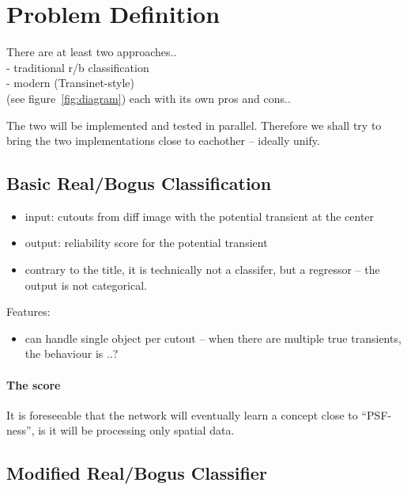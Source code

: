 \section{Problem Definition}

There are at least two approaches..
\\- traditional r/b classification
\\- modern (Transinet-style)\\

(see figure~\ref{fig:diagram})
each with its own pros and cons..

The two will be implemented and tested in parallel. Therefore we shall try to bring the two implementations close to eachother -- ideally unify.


\subsection{Basic Real/Bogus Classification}

\begin{itemize}
  \item input: cutouts from diff image with the potential transient at the center
  \item output: reliability score for the potential transient
  \item contrary to the title, it is technically not a classifer, but a regressor -- the output is not categorical.
\end{itemize}

Features:
\begin{itemize}
  \item can handle single object per cutout -- when there are multiple true transients, the behaviour is ..?
\end{itemize}

\paragraph{The score}
It is foreseeable that the network will eventually learn a concept close to ``PSF-ness'', is it will be processing only spatial data.


\subsection{Modified Real/Bogus Classifier}


